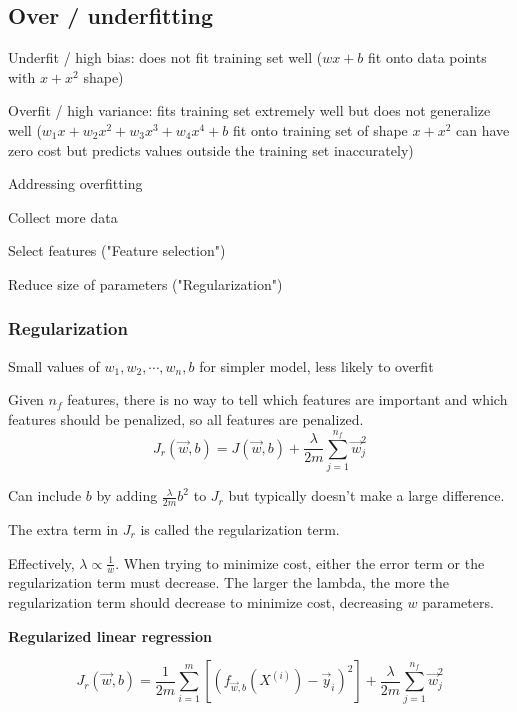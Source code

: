 \documentclass[12pt]{article}
\begin{document}
\subsection{Over / underfitting}

Underfit / high bias: does not fit training set well ($wx + b$ fit onto data points with $x + x^2$ shape)

Overfit / high variance: fits training set extremely well but does not generalize well ($w_1 x + w_2 x^2 + w_3 x^3 + w_4 x^4 + b$ fit onto training set of shape $x + x^2$ can have zero cost but predicts values outside the training set inaccurately)

\vspace{5px}

Addressing overfitting
\begin{myitemize}
	\item Collect more data
	\item Select features ("Feature selection")
	\item Reduce size of parameters ("Regularization")
\end{myitemize}

\subsubsection{Regularization}

Small values of $w_1,w_2,\cdots,w_n,b$ for simpler model, less likely to overfit

Given $n_f$ features, there is no way to tell which features are important and which features should be penalized, so all features are penalized.
\[ J_r(\vec{w},b) = J(\vec{w},b) + \frac{\lambda}{2m} \sum_{j=1}^{n_f} \vec{w}_j^2 \]

Can include $b$ by adding $\frac{\lambda}{2m} b^2$ to $J_r$ but typically doesn't make a large difference.

The extra term in $J_r$ is called the regularization term.

Effectively, $\lambda \propto \frac{1}{w}$. When trying to minimize cost, either the error term or the regularization term must decrease. The larger the lambda, the more the regularization term should decrease to minimize cost, decreasing $w$ parameters.

\noindent \textbf{Regularized linear regression}

\[ J_r(\vec{w},b) = \frac{1}{2m} \sum_{i=1}^m \left[(f_{\vec{w},b}(X^{(i)}) - \vec{y}_i)^2\right] + \frac{\lambda}{2m} \sum_{j=1}^{n_f} \vec{w}_j^2 \]
\end{document}
